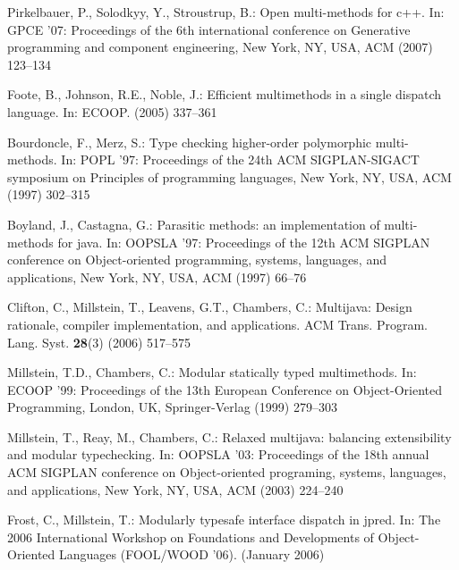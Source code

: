 \documentclass[11pt]{article}
\begin{document}
\begin{thebibliography}{10}
Pirkelbauer, P., Solodkyy, Y., Stroustrup, B.:
\newblock Open multi-methods for c++.
\newblock In: GPCE '07: Proceedings of the 6th international conference on
  Generative programming and component engineering, New York, NY, USA, ACM
  (2007)  123--134

Foote, B., Johnson, R.E., Noble, J.:
\newblock Efficient multimethods in a single dispatch language.
\newblock In: ECOOP. (2005)  337--361

Bourdoncle, F., Merz, S.:
\newblock Type checking higher-order polymorphic multi-methods.
\newblock In: POPL '97: Proceedings of the 24th ACM SIGPLAN-SIGACT symposium on
  Principles of programming languages, New York, NY, USA, ACM (1997)  302--315

Boyland, J., Castagna, G.:
\newblock Parasitic methods: an implementation of multi-methods for java.
\newblock In: OOPSLA '97: Proceedings of the 12th ACM SIGPLAN conference on
  Object-oriented programming, systems, languages, and applications, New York,
  NY, USA, ACM (1997)  66--76

Clifton, C., Millstein, T., Leavens, G.T., Chambers, C.:
\newblock Multijava: Design rationale, compiler implementation, and
  applications.
\newblock ACM Trans. Program. Lang. Syst. \textbf{28}(3) (2006)  517--575

Millstein, T.D., Chambers, C.:
\newblock Modular statically typed multimethods.
\newblock In: ECOOP '99: Proceedings of the 13th European Conference on
  Object-Oriented Programming, London, UK, Springer-Verlag (1999)  279--303

Millstein, T., Reay, M., Chambers, C.:
\newblock Relaxed multijava: balancing extensibility and modular typechecking.
\newblock In: OOPSLA '03: Proceedings of the 18th annual ACM SIGPLAN conference
  on Object-oriented programing, systems, languages, and applications, New
  York, NY, USA, ACM (2003)  224--240

Frost, C., Millstein, T.:
\newblock Modularly typesafe interface dispatch in jpred.
\newblock In: The 2006 International Workshop on Foundations and Developments
  of Object-Oriented Languages (FOOL/WOOD '06). (January 2006)

\end{thebibliography}
\end{document}
